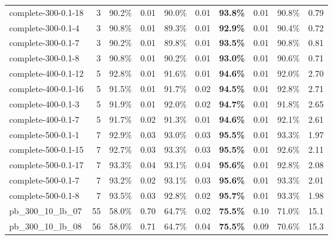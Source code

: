 \documentclass{llncs}
\begin{document}
\begin{table}
\begin{center}
\begin{tabular}{|l|r|c|c|c|c|c|c|c|c|}
complete-300-0.1-18      & 3    & 90.2\% & 0.01 & 90.0\% & 0.01 & \textbf{93.8\%} & 0.01 & 90.8\% & 0.79 \\
complete-300-0.1-4       & 3    & 90.8\% & 0.01 & 89.3\% & 0.01 & \textbf{92.9\%} & 0.01 & 90.4\% & 0.72 \\
complete-300-0.1-7       & 3    & 90.2\% & 0.01 & 89.8\% & 0.01 & \textbf{93.5\%} & 0.01 & 90.8\% & 0.81 \\
complete-300-0.1-8       & 3    & 90.8\% & 0.01 & 90.2\% & 0.01 & \textbf{93.0\%} & 0.01 & 90.6\% & 0.71 \\
complete-400-0.1-12      & 5    & 92.8\% & 0.01 & 91.6\% & 0.01 & \textbf{94.6\%} & 0.01 & 92.0\% & 2.70 \\
complete-400-0.1-16      & 5    & 91.5\% & 0.01 & 91.7\% & 0.02 & \textbf{94.5\%} & 0.01 & 92.8\% & 2.71 \\
complete-400-0.1-3       & 5    & 91.9\% & 0.01 & 92.0\% & 0.02 & \textbf{94.7\%} & 0.01 & 91.8\% & 2.65 \\
complete-400-0.1-7       & 5    & 91.7\% & 0.02 & 91.3\% & 0.01 & \textbf{94.6\%} & 0.01 & 92.1\% & 2.61 \\
complete-500-0.1-1       & 7    & 92.9\% & 0.03 & 93.0\% & 0.03 & \textbf{95.5\%} & 0.01 & 93.3\% & 1.97 \\
complete-500-0.1-15      & 7    & 92.7\% & 0.03 & 93.3\% & 0.03 & \textbf{95.5\%} & 0.01 & 92.6\% & 2.11 \\
complete-500-0.1-17      & 7    & 93.3\% & 0.04 & 93.1\% & 0.04 & \textbf{95.6\%} & 0.01 & 92.8\% & 2.08 \\
complete-500-0.1-7       & 7    & 93.2\% & 0.02 & 93.1\% & 0.03 & \textbf{95.6\%} & 0.01 & 93.3\% & 2.01 \\
complete-500-0.1-8       & 7    & 93.5\% & 0.03 & 92.8\% & 0.02 & \textbf{95.7\%} & 0.01 & 93.3\% & 1.98 \\

pb\_300\_10\_lb\_07      & 55   & 58.0\% & 0.70 & 64.7\% & 0.02 & \textbf{75.5\%} & 0.10 & 71.0\% & 15.1 \\
pb\_300\_10\_lb\_08      & 56   & 58.0\% & 0.71 & 64.7\% & 0.04 & \textbf{75.5\%} & 0.09 & 70.6\% & 15.3 \\


\end{tabular}
\end{center}
\end{table}
\end{document}
